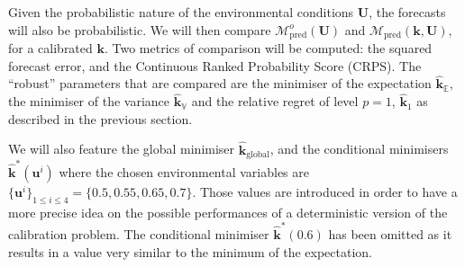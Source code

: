 \documentclass[preprint, 1p]{elsarticle}
\newcommand{\Ex}{\mathbb{E}}
\newcommand{\hatkmean}{\hat{\mathbf{k}}_{\Ex}}
\newcommand{\hatkvar}{\hat{\mathbf{k}}_{\mathbb{V}}}
\newcommand{\kest}{\hat{\mathbf{k}}}
\begin{document}
Given the probabilistic nature of the environmental conditions $\mathbf{U}$, the forecasts will also be probabilistic. We will then compare $\mathcal{M}_{\mathrm{pred}}^o(\mathbf{U})$ and $\mathcal{M}_{\mathrm{pred}}(\mathbf{k},\mathbf{U})$, for a calibrated $\mathbf{k}$. Two metrics of comparison will be computed: the squared forecast error, and the Continuous Ranked Probability Score (CRPS). The ``robust'' parameters that are compared are the minimiser of the expectation $\hatkmean$, the minimiser of the variance $\hatkvar$ and the relative regret of level $p=1$, $\kest_1$ as described in the previous section.

We will also feature the global minimiser $\kest_{\mathrm{global}}$, and the conditional minimisers $\kest^*(\mathbf{u}^i)$ where the chosen environmental variables are $\{\mathbf{u}^i\}_{1\leq i \leq 4} = \{0.5, 0.55, 0.65, 0.7\}$. Those values are introduced in order to have a more precise idea on the possible performances of a deterministic version of the calibration problem.
The conditional minimiser $\kest^*(0.6)$ has been omitted as it results in a value very similar to the minimum of the expectation.
\end{document}
